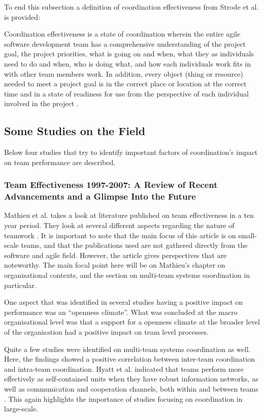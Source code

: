To end this subsection a definition of coordination effectiveness from Strode et al. is provided:

\begin{fancyquotes}
Coordination effectiveness is a state of coordination wherein the entire agile software development team has a comprehensive understanding of the project goal, the project priorities, what is going on and when, what they as individuals need to do and when, who is doing what, and how each individuals work fits in with other team members work. In addition, every object (thing or resource) needed to meet a project goal is in the correct place or location at the correct time and in a state of readiness for use from the perspective of each individual involved in the project \cite{Strode2011}.
\end{fancyquotes}

\subsection{Some Studies on the Field}

Below four studies that try to identify important factors of coordination's impact on team performance are described.

\subsubsection{Team Effectiveness 1997-2007: A Review of Recent Advancements and a Glimpse Into the Future}

Mathieu et al. takes a look at literature published on team effectiveness in a ten year period. They look at several different aspects regarding the nature of teamwork \cite{Mathieu2008}. It is important to note that the main focus of this article is on small-scale teams, and that the publications used are not gathered directly from the software and agile field. However, the article gives perspectives that are noteworthy. The main focal point here will be on Mathieu's chapter on organisational contexts, and the section on multi-team systems coordination in particular.

One aspect that was identified in several studies having a positive impact on performance was an ``openness climate''. What was concluded at the macro organisational level was that a support for a openness climate at the broader level of the organisation had a positive impact on team level processes.

Quite a few studies were identified on multi-team systems coordination as well. Here, the findings showed a positive correlation between inter-team coordination and intra-team coordination. Hyatt et al. indicated that teams perform more effectively as self-contained units when they have robust information networks, as well as communication and cooperation channels, both within and between teams \cite{Hyatt1997}. This again highlights the importance of studies focusing on coordination in large-scale.

